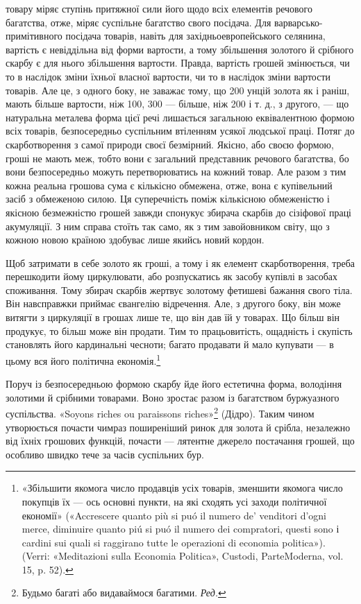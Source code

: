 \parcont{}  %
товару міряє ступінь притяжної сили його щодо всіх елементів
речового багатства, отже, міряє суспільне багатство свого посідача.
Для варварсько-примітивного посідача товарів, навіть
для західньоевропейського селянина, вартість є невіддільна від
форми вартости, а тому збільшення золотого й срібного скарбу
є для нього збільшення вартости. Правда, вартість грошей змінюється,
чи то в наслідок зміни їхньої власної вартости, чи то
в наслідок зміни вартости товарів. Але це, з одного боку, не
заважає тому, що 200 унцій золота як і раніш, мають більше
вартости, ніж 100, 300 — більше, ніж 200 і т. д., з другого, —
що натуральна металева форма цієї речі лишається загальною
еквівалентною формою всіх товарів, безпосередньо суспільним
втіленням усякої людської праці. Потяг до скарботворення з
самої природи своєї безмірний. Якісно, або своєю формою, гроші
не мають меж, тобто вони є загальний представник речового
багатства, бо вони безпосередньо можуть перетворюватись на
кожний товар. Але разом з тим кожна реальна грошова сума є
кількісно обмежена, отже, вона є купівельний засіб з обмеженою
силою. Ця суперечність поміж кількісною обмеженістю і якісною
безмежністю грошей завжди спонукує збирача скарбів до сізіфової
праці акумуляції. З ним справа стоїть так само, як з
тим завойовником світу, що з кожною новою країною здобуває
лише якийсь новий кордон.

Щоб затримати в себе золото як гроші, а тому і як елемент
скарботворення, треба перешкодити йому циркулювати, або розпускатись
як засобу купівлі в засобах споживання. Тому збирач
скарбів жертвує золотому фетишеві бажання свого тіла.
Він навсправжки приймає євангелію відречення. Але, з другого
боку, він може витягти з циркуляції в грошах лише те, що він
дав їй у товарах. Що більш він продукує, то більш може він
продати. Тим то працьовитість, ощадність і скупість становлять
його кардинальні чесноти; багато продавати й мало купувати —
в цьому вся його політична економія.\footnote{
«Збільшити якомога число продавців усіх товарів, зменшити якомога
число покупців їх — ось основні пункти, на які сходять усі заходи
політичної економії» («Accrescere quanto più si puó il numero de’ venditori
d’ogni merce, diminuire quanto piú si puó il numero dei compratori, questi
sono і cardini sui quali si raggirano tutte le operazioni di economia politica»).
(Verri: «Meditazioni sulla Economia Politica», Custodi, ParteModerna,
vol. 15, p. 52).
}

Поруч із безпосередньою формою скарбу йде його естетична
форма, володіння золотими й срібними товарами. Воно зростає
разом із багатством буржуазного суспільства. «Soyons riches
ou paraissons riches»\footnote*{
Будьмо багаті або видаваймося багатими. \emph{Ред.}
} (Дідро). Таким чином утворюється почасти
чимраз поширеніший ринок для золота й срібла, незалежно від
їхніх грошових функцій, почасти — лятентне джерело постачання
грошей, що особливо швидко тече за часів суспільних бур.

